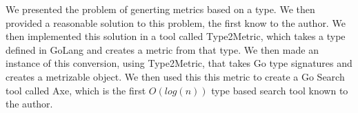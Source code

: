 We presented the problem of generting metrics based on a type.
We then provided a reasonable solution to this problem,
the first know to the author.
We then implemented this solution in a tool called Type2Metric,
which takes a type defined in GoLang and creates a metric from that type.
We then made an instance of this conversion,
using Type2Metric,
that takes Go type signatures and creates a metrizable object.
We then used this this metric to create a Go Search tool called Axe,
which is the first $O(log(n))$ type based search tool known to the author.
